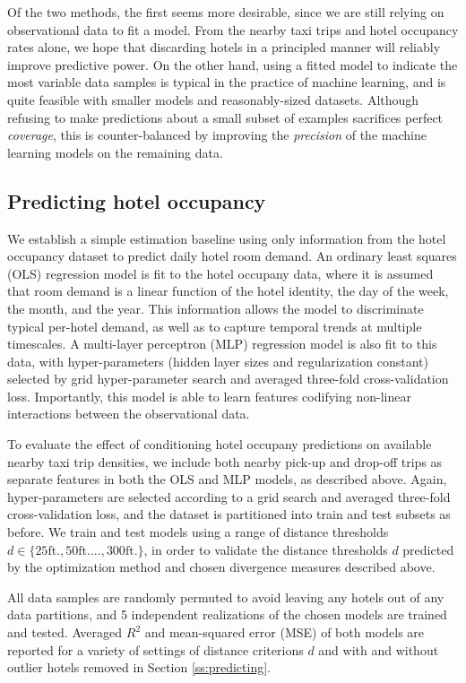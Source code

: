 \documentclass[useAMS, usenatbib]{biom}
\begin{document}
Of the two methods, the first seems more desirable, since we are still relying on observational data to fit a model. From the nearby taxi trips and hotel occupancy rates alone, we hope that discarding hotels in a principled manner will reliably improve predictive power. On the other hand, using a fitted model to indicate the most variable data samples is typical in the practice of machine learning, and is quite feasible with smaller models and reasonably-sized datasets. Although refusing to make predictions about a small subset of examples sacrifices perfect \textit{coverage}, this is counter-balanced by improving the \textit{precision} of the machine learning models on the remaining data.

\subsection{Predicting hotel occupancy}

We establish a simple estimation baseline using only information from the hotel occupancy dataset to predict daily hotel room demand. An ordinary least squares (OLS) regression model is fit to the hotel occupany data, where it is assumed that room demand is a linear function of the hotel identity, the day of the week, the month, and the year. This information allows the model to discriminate typical per-hotel demand, as well as to capture temporal trends at multiple timescales. A multi-layer perceptron (MLP) regression model is also fit to this data, with hyper-parameters (hidden layer sizes and regularization constant) selected by grid hyper-parameter search and averaged three-fold cross-validation loss. Importantly, this model is able to learn features codifying non-linear interactions between the observational data.

To evaluate the effect of conditioning hotel occupany predictions on available nearby taxi trip densities, we include both nearby pick-up and drop-off trips as separate features in both the OLS and MLP models, as described above. Again, hyper-parameters are selected according to a grid search and averaged three-fold cross-validation loss, and the dataset is partitioned into train and test subsets as before. We train and test models using a range of distance thresholds $d \in \{25 \mathrm{ft.}, 50 \mathrm{ft.} ..., 300 \mathrm{ft.} \}$, in order to validate the distance thresholds $d$ predicted by the optimization method and chosen divergence measures described above.

All data samples are randomly permuted to avoid leaving any hotels out of any data partitions, and 5 independent realizations of the chosen models are trained and tested. Averaged $R^2$ and mean-squared error (MSE) of both models are reported for a variety of settings of distance criterions $d$ and with and without outlier hotels removed in Section \ref{ss:predicting}.
\end{document}
